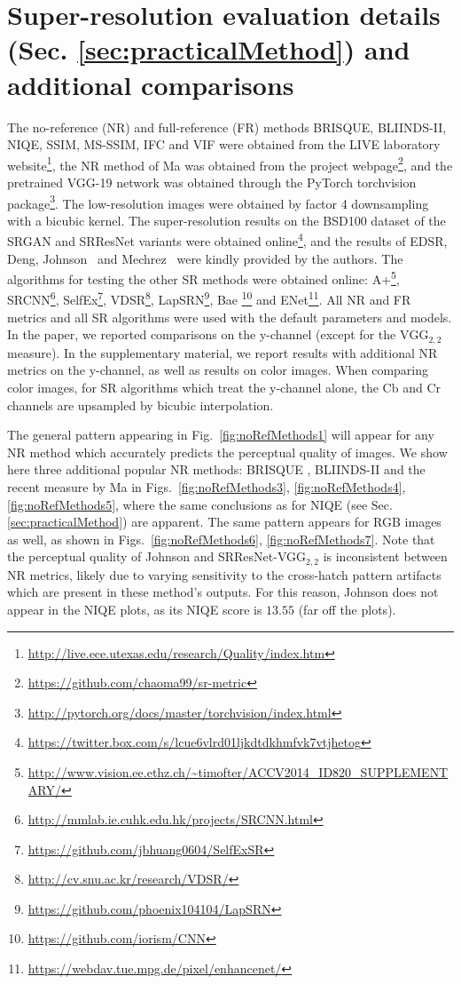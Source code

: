 \section{Super-resolution evaluation details (Sec. \ref{sec:practicalMethod}) and additional comparisons}\label{sec:SR_details}
The no-reference (NR) and full-reference (FR) methods BRISQUE, BLIINDS-II, NIQE, SSIM, MS-SSIM, IFC and VIF were obtained from the LIVE laboratory website\footnote{\url{http://live.ece.utexas.edu/research/Quality/index.htm}}, the NR method of Ma \etal was obtained from the project webpage\footnote{\url{https://github.com/chaoma99/sr-metric}}, and the pretrained VGG-19 network was obtained through the PyTorch torchvision package\footnote{\url{http://pytorch.org/docs/master/torchvision/index.html}}. The low-resolution images were obtained by factor 4 downsampling with a bicubic kernel. The super-resolution results on the BSD100 dataset of the SRGAN and SRResNet variants were obtained online\footnote{\url{https://twitter.box.com/s/lcue6vlrd01ljkdtdkhmfvk7vtjhetog}}, and the results of EDSR, Deng, Johnson \etal~and Mechrez \etal~were kindly provided by the authors. The algorithms for testing the other SR methods were obtained online: A+\footnote{\url{http://www.vision.ee.ethz.ch/~timofter/ACCV2014_ID820_SUPPLEMENTARY/}}, SRCNN\footnote{\url{http://mmlab.ie.cuhk.edu.hk/projects/SRCNN.html}}, SelfEx\footnote{\url{https://github.com/jbhuang0604/SelfExSR}},  VDSR\footnote{\url{http://cv.snu.ac.kr/research/VDSR/}}, LapSRN\footnote{\url{https://github.com/phoenix104104/LapSRN}}, Bae \etal\footnote{\url{https://github.com/iorism/CNN}} and ENet\footnote{\url{https://webdav.tue.mpg.de/pixel/enhancenet/}}. All NR and FR metrics and all SR algorithms were used with the default parameters and models. In the paper, we reported comparisons on the y-channel (except for the $\text{VGG}_{2,2}$ measure). In the supplementary material, we report results with additional NR metrics on the y-channel, as well as results on color images. When comparing color images, for SR algorithms which treat the y-channel alone, the Cb and Cr channels are upsampled by bicubic interpolation.

The general pattern appearing in Fig.~\ref{fig:noRefMethods1} will appear for any NR method which accurately predicts the perceptual quality of images. We show here three additional popular NR methods: BRISQUE \cite{mittal2012no}, BLIINDS-II \cite{saad2012blind} and the recent measure by Ma \etal \cite{ma2017learning} in Figs.~\ref{fig:noRefMethods3}, \ref{fig:noRefMethods4}, \ref{fig:noRefMethods5}, where the same conclusions as for NIQE \cite{mittal2013making} (see Sec. \ref{sec:practicalMethod}) are apparent. The same pattern appears for RGB images as well, as shown in Figs.~\ref{fig:noRefMethods6}, \ref{fig:noRefMethods7}. Note that the perceptual quality of Johnson \etal and SRResNet-VGG$_{2,2}$ is inconsistent between NR metrics, likely due to varying sensitivity to the cross-hatch pattern artifacts which are present in these method's outputs. For this reason, Johnson \etal does not appear in the NIQE plots, as its NIQE score is $13.55$ (far off the plots).


